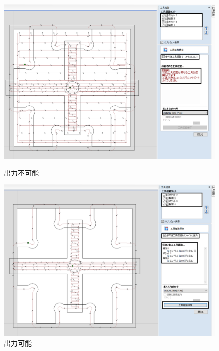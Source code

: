 \documentclass[b5paper, 9pt, twocolumn, titlepage,openany]{jsbook}%
\begin{document}
\begin{figure}[tbh]
  \begin{center}
    \begin{minipage}{0.6\columnwidth}
      \includegraphics[width=\columnwidth]{NC_output_fail_trim.png}
    \end{minipage}
    \caption{出力不可能\label{fail}}
    \begin{minipage}{0.6\columnwidth}
      \includegraphics[width=\columnwidth]{NC_output_succeed_trim.png}
    \end{minipage}
    \caption{出力可能\label{succeed}}
  \end{center}
\end{figure}

\end{document}
